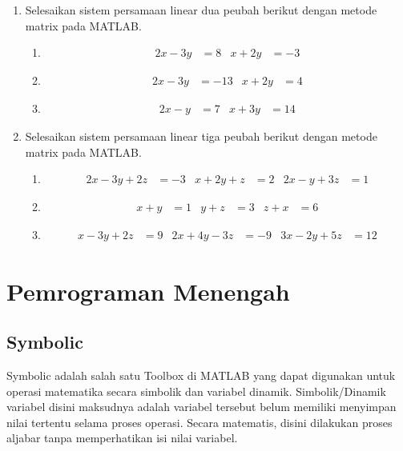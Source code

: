 \documentclass[12pt]{book}
\begin{document}
	\begin{enumerate}
		\item Selesaikan sistem persamaan linear dua peubah berikut dengan metode matrix pada MATLAB.
		\begin{enumerate}[label=(\alph*)]
			\item
			\begin{align*}
				2x-3y&=8 & x+2y&=-3
			\end{align*}
		
			\item
			\begin{align*}
				2x-3y&=-13 & x+2y&=4
			\end{align*}
		
			\item
			\begin{align*}
				2x-y&=7 & x+3y&=14
			\end{align*}
		\end{enumerate}
	
		\item Selesaikan sistem persamaan linear tiga peubah berikut dengan metode matrix pada MATLAB.
		\begin{enumerate}[label=(\alph*)]
			\item 
			\begin{align*}
				2x-3y+2z&=-3 & x+2y+z&=2 & 2x-y+3z&=1
			\end{align*}
		
			\item 
			\begin{align*}
				x+y&=1 & y+z&=3 & z+x&=6
			\end{align*}
		
			\item
			\begin{align*}
				x-3y+2z&=9 & 2x+4y-3z&=-9 & 3x-2y+5z&=12
			\end{align*}
		\end{enumerate}
	\end{enumerate}

	\newpage
	\chapter{Pemrograman Menengah}

	\section{Symbolic}
	
	Symbolic adalah salah satu Toolbox di MATLAB yang dapat digunakan untuk operasi matematika secara simbolik dan variabel dinamik.
	Simbolik/Dinamik variabel disini maksudnya adalah variabel tersebut belum memiliki menyimpan nilai tertentu selama proses operasi.
	Secara matematis, disini dilakukan proses aljabar tanpa memperhatikan isi nilai variabel.
	
\end{document}
